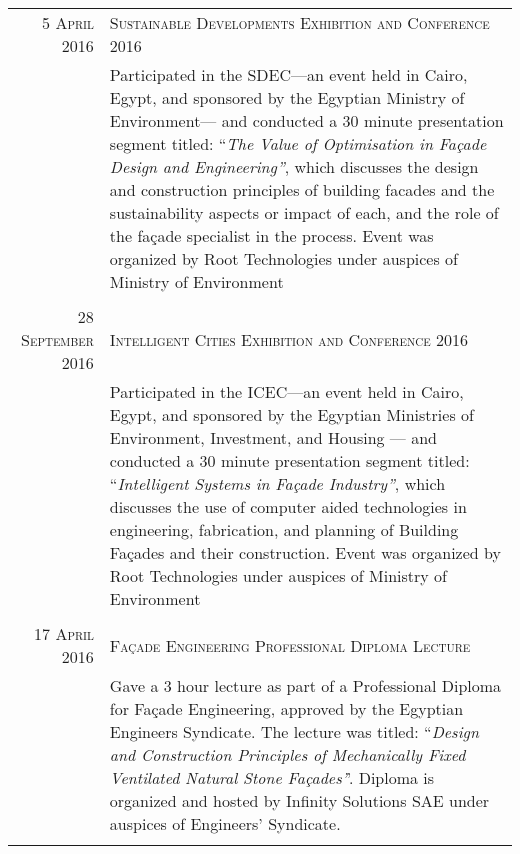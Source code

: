 \documentclass[a4paper,11pt]{article} %
\begin{document}
\begin{tabular}{r|p{11cm}}
\textsc{5 April 2016} & \textsc{Sustainable Developments Exhibition and Conference 2016}\\ 
& \footnotesize{Participated in the SDEC---an event held in Cairo, Egypt, and sponsored by the Egyptian Ministry of Environment--- and conducted a 30 minute presentation segment titled: ``\emph{The Value of Optimisation in Fa\c{c}ade Design and Engineering''}, which discusses the design and construction principles of building facades and the sustainability aspects or impact of each, and the role of the fa\c{c}ade specialist in the process. Event was organized by Root Technologies under auspices of Ministry of Environment}\\
\multicolumn{2}{c}{} \\


\textsc{28 September 2016} & \textsc{Intelligent Cities Exhibition and Conference 2016}\\ 
& \footnotesize{Participated in the ICEC---an event held in Cairo, Egypt, and sponsored by the Egyptian Ministries of Environment, Investment, and Housing --- and conducted a 30 minute presentation segment titled: ``\emph{Intelligent Systems in Fa\c{c}ade Industry''}, which discusses the use of computer aided technologies in engineering, fabrication, and planning of Building Fa\c{c}ades and their construction. Event was organized by Root Technologies under auspices of Ministry of Environment}\\
\multicolumn{2}{c}{} \\

\textsc{17 April 2016} & \textsc{Fa\c{c}ade Engineering Professional Diploma Lecture}\\ 
& \footnotesize{Gave a 3 hour lecture as part of a Professional Diploma for Fa\c{c}ade Engineering, approved by the Egyptian Engineers Syndicate. The lecture was titled: ``\emph{Design and Construction Principles of Mechanically Fixed Ventilated Natural Stone Fa\c{c}ades'}'. Diploma is organized and hosted by Infinity Solutions SAE under auspices of Engineers' Syndicate.}\\
\multicolumn{2}{c}{} \\
	
\end{tabular}


\end{document}
